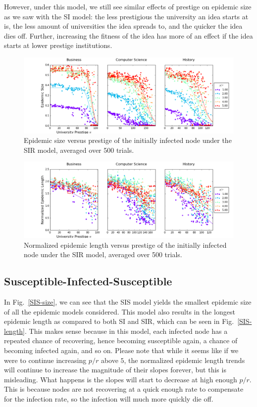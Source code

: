 \documentclass[%
 reprint,
 amsmath,amssymb,
 aps,
]{revtex4-1}
\begin{document}
However, under this model, we still see similar effects of prestige on epidemic size as we saw with the SI model: the less prestigious the university an idea starts at is, the less amount of universities the idea spreads to, and the quicker the idea dies off. Further, increasing the fitness of the idea has more of an effect if the idea starts at lower prestige institutions.

\begin{figure}
	\centering
  \includegraphics[width=\textwidth]{figures/size-results-of-ALL-SIR.png}
  \caption{Epidemic size versus prestige of the initially infected node under the SIR model, averaged over 500 trials.}
    \label{SIR-size}
\end{figure}

\begin{figure}
	\centering
  \includegraphics[width=\textwidth]{figures/length-results-of-ALL-SIR.png}
  \caption{Normalized epidemic length versus prestige of the initially infected node under the SIR model, averaged over 500 trials.}
   \label{SIR-length}
\end{figure}

\subsection{\label{sec:level2}Susceptible-Infected-Susceptible}

In Fig.~\ref{SIS-size}, we can see that the SIS model yields the smallest epidemic size of all the epidemic models considered. This model also results in the longest epidemic length as compared to both SI and SIR, which can be seen in Fig.~\ref{SIS-length}. This makes sense because in this model, each infected node has a repeated chance of recovering, hence becoming susceptible again, a chance of becoming infected again, and so on. Please note that while it seems like if we were to continue increasing $p/r$ above $5$, the normalized epidemic length trends will continue to increase the magnitude of their slopes forever, but this is misleading. What happens is the slopes will start to decrease at high enough $p/r$. This is because nodes are not recovering at a quick enough rate to compensate for the infection rate, so the infection will much more quickly die off.
\end{document}
